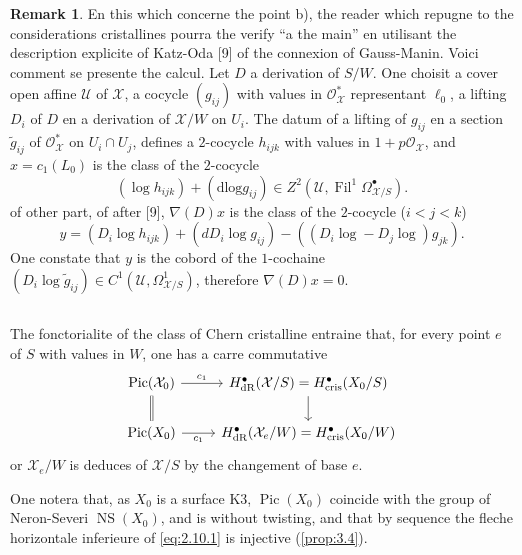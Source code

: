 \documentclass[12pt,a4paper]{article}
\theoremstyle{plain}
\theoremstyle{definition}
\newtheorem{remark}[theorem]{Remark}
\theoremstyle{remark}
\DeclareMathOperator{\Pic}{Pic}
\DeclareMathOperator{\Fil}{Fil}
\DeclareMathOperator{\NS}{NS}
\newcommand{\dlog}{\mathrm{dlog}}
\newcommand{\cris}{\mathrm{cris}}
\begin{document}
\begin{remark}\label{rem:2.9.5}
En this which concerne the point b), the reader which repugne to the considerations cristallines pourra the verify ``a the main'' en utilisant the description explicite of Katz-Oda [9] of the connexion of Gauss-Manin. Voici comment se presente the calcul. Let $D$ a derivation of $S/W$. One choisit a cover open affine $\mathcal{U}$ of $\mathcal{X}$, a cocycle $(g_{ij})$ with values in $\mathcal{O}_{\mathcal{X}}^*$ representant $\ell_0$, a lifting $D_i$ of $D$ en a derivation of $\mathcal{X}/W$ on $U_i$. The datum of a lifting of $g_{ij}$ en a section $\tilde{g}_{ij}$ of $\mathcal{O}_{\mathcal{X}}^*$ on $U_i \cap U_j$, defines a $2$-cocycle $h_{ijk}$ with values in $1 + p\mathcal{O}_{\mathcal{X}}$, and $x = c_1(L_0)$ is the class of the $2$-cocycle
\[
(\log h_{ijk}) + (\dlog g_{ij}) \in Z^2(\mathcal{U}, \Fil^1 \Omega^{\bullet}_{\mathcal{X}/S}).
\]
of other part, of after [9], $\nabla(D)x$ is the class of the $2$-cocycle ($i < j < k$)
\[
y = (D_i \log h_{ijk}) + (d D_i \log g_{ij}) - ((D_i \log - D_j \log) g_{jk}).
\]
One constate that $y$ is the cobord of the $1$-cochaine $(D_i \log \tilde{g}_{ij}) \in C^1(\mathcal{U}, \Omega^1_{\mathcal{X}/S})$, therefore $\nabla(D)x = 0$.
\end{remark}

\subsection{}

The fonctorialite of the class of Chern cristalline entraine that, for every point $e$ of $S$ with values in $W$, one has a carre commutative
\begin{equation}\label{eq:2.10.1}
\begin{tikzcd}
\Pic(\mathcal{X}_0) \arrow[r, "c_1"] \arrow[d, equal] & H^{\bullet}_{\mathrm{dR}}(\mathcal{X}/S) = H^{\bullet}_{\cris}(X_0/S) \arrow[d] \\
\Pic(X_0) \arrow[r, "c_1"'] & H^{\bullet}_{\mathrm{dR}}(\mathcal{X}_e/W) = H^{\bullet}_{\cris}(X_0/W)
\end{tikzcd}
\end{equation}
or $\mathcal{X}_e/W$ is deduces of $\mathcal{X}/S$ by the changement of base $e$.

One notera that, as $X_0$ is a surface K3, $\Pic(X_0)$ coincide with the group of Neron-Severi $\NS(X_0)$, and is without twisting, and that by sequence the fleche horizontale inferieure of \eqref{eq:2.10.1} is injective (\ref{prop:3.4}).
\end{document}
